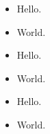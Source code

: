 \documentclass[14pt, aspectratio=169]{beamer}
\begin{document}
\begin{frame}
  \begin{itemize}
    \item Hello.
    \item World.
  \end{itemize}
\end{frame}

\begin{frame}
  \begin{itemize}
    \item Hello.
    \item World.
  \end{itemize}
\end{frame}

\begin{frame}
  \begin{itemize}
    \item Hello.
    \item World.
  \end{itemize}
\end{frame}
\end{document}
